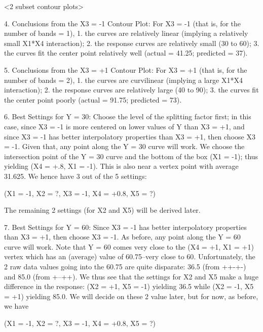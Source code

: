          <2 subset contour plots>

   4. Conclusions from the X3 = -1 Contour Plot:
      For X3 = -1 (that is, for the number of bands = 1),
         1. the curves are relatively linear
            (implying a relatively small X1*X4 interaction);
         2. the response curves are relatively small
            (30 to 60);
         3. the curves fit the center point relatively well
            (actual = 41.25; predicted = 37).

   5. Conclusions from the X3 = +1 Contour Plot:
      For X3 = +1 (that is, for the number of bands = 2),
         1. the curves are curvilinear
            (implying a large X1*X4 interaction);
         2. the response curves are relatively large
            (40 to 90);
         3. the curves fit the center point poorly
            (actual = 91.75; predicted = 73).

   6. Best Settings for Y = 30:
      Choose the level of the splitting factor
      first; in this case, since X3 = -1 is more
      centered on lower values of Y than X3 = +1,
      and since X3 = -1 has better interpolatory
      properties than X3 = +1, then choose X3 =
      -1.  Given that, any point along the Y = 30
      curve will work.  We choose the intersection
      point of the Y = 30 curve and the bottom of
      the box (X1 = -1); thus yielding (X4 = +.8,
      X1 = -1).  This is also near a vertex point
      with average 31.625.  We hence have 3 out of
      the 5 settings:

         (X1 = -1, X2 = ?, X3 = -1, X4 = +0.8, X5 = ?)

      The remaining 2 settings (for X2 and X5)
      will be derived later.

   7. Best Settings for Y = 60:
      Since X3 = -1 has better interpolatory
      properties than X3 = +1, then choose X3 =
      -1.  As before, any point along the Y = 60
      curve will work.  Note that Y = 60 comes
      very close to the (X4 = +1, X1 = +1) vertex
      which has an (average) value of 60.75--very
      close to 60.  Unfortunately, the 2 raw data
      values going into the 60.75 are quite
      disparate: 36.5 (from ++-+-) and 85.0 (from
      +--++).  We thus see that the settings for
      X2 and X5 make a huge difference in the
      response: (X2 = +1, X5 = -1) yielding 36.5
      while (X2 = -1, X5 = +1) yielding 85.0.  We
      will decide on these 2 value later, but for
      now, as before, we have

         (X1 = -1, X2 = ?, X3 = -1, X4 = +0.8, X5 = ?)

